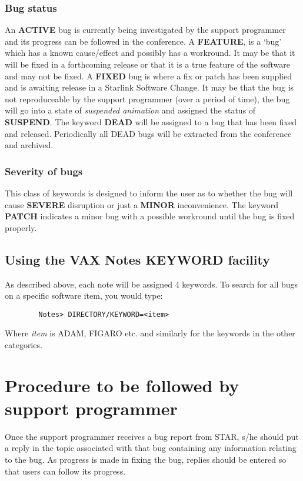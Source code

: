 \documentclass[twoside,11pt]{article}
\begin{document}
\subsubsection{Bug status}
An {\bf ACTIVE} bug is currently being investigated by the support programmer
and its progress can be followed in the conference. A {\bf FEATURE}, is a `bug'
which has a known cause/effect and possibly has a workround.
It may be that it will be
fixed in a forthcoming release or that it is a true feature of the software and
may not be fixed. A {\bf FIXED} bug is where a fix or patch has been supplied
and is awaiting release in a Starlink Software Change. It may be that the bug
is not reproduceable by the support programmer (over a period of time), the
bug will go into a state of {\em suspended animation} and assigned the status
of {\bf SUSPEND}. The keyword {\bf DEAD} will be assigned to a bug that has
been fixed and released. Periodically all DEAD bugs will be extracted from the
conference and archived.
\subsubsection{Severity of bugs}
This class of keywords is designed to inform the user as to whether the bug
will cause {\bf SEVERE} disruption or just a {\bf MINOR} inconvenience. The
keyword {\bf PATCH} indicates a minor bug with a possible workround
until the bug is fixed properly.
\subsection{Using the VAX Notes KEYWORD facility}
As described above, each note will be assigned 4 keywords. To search for all
bugs on a specific software item, you would type:
\begin{verbatim}
        Notes> DIRECTORY/KEYWORD=<item>
\end{verbatim}
Where {\em item} is ADAM, FIGARO  etc.
and similarly for the keywords in the other categories.
\newpage
\section{Procedure to be followed by support programmer}
Once the support programmer receives a bug report from STAR, s/he should put a
reply in the topic associated with that bug containing any information relating
to the bug. As progress is made in fixing the bug, replies should be entered
so that users can follow its progress.
\end{document}
